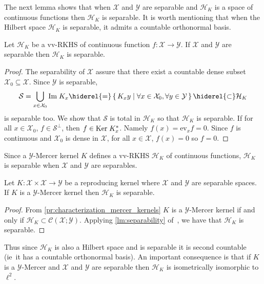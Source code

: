 The next lemma shows that when $\mathcal{X}$ and $\mathcal{Y}$ are separable
and $\mathcal{H}_K$ is a space of continuous functions then $\mathcal{H}_K$ is
separable. It is worth mentioning that when the Hilbert space $\mathcal{H}_K$
is separable, it admits a countable orthonormal basis.
\begin{lemma}
    \label{lm:separability} Let $\mathcal{H}_K$ be a \acl{vv-RKHS} of
    continuous function $f:\mathcal{X}\to\mathcal{Y}$. If $\mathcal{X}$ and
    $\mathcal{Y}$ are separable then $\mathcal{H}_K$ is separable.
\end{lemma}
\begin{proof}
    The separability of $\mathcal{X}$ assure that there exist a countable dense
    subset $\mathcal{X}_0\subseteq\mathcal{X}$. Since $\mathcal{Y}$ is
    separable,
    \begin{dmath*}
        \mathcal{S}=\bigcup_{x\in\mathcal{X}_0}\Ima K_x
        \hiderel{=}\set{K_xy|\forall x\in\mathcal{X}_0, \forall
        y\in\mathcal{Y}}\hiderel{\subset} \mathcal{H}_K
    \end{dmath*}
    is separable too. We show that $\mathcal{S}$ is total in $\mathcal{H}_K$ so
    that $\mathcal{H}_K$ is separable. If for all $x\in\mathcal{X}_0$,
    $f\in\mathcal{S}^{\perp}$, then $f\in\text{Ker}\; K_x^*$. Namely
    $f(x)=\text{ev}_xf=0$. Since $f$ is continuous and $\mathcal{X}_0$ is dense
    in $\mathcal{X}$, for all $x\in\mathcal{X}$, $f(x)=0$ so $f=0$.
\end{proof}
Since a $\mathcal{Y}$-Mercer kernel $K$ defines a \ac{vv-RKHS} $\mathcal{H}_K$
of continuous functions, $\mathcal{H}_K$ is separable when $\mathcal{X}$ and
$\mathcal{Y}$ are separables.
\begin{proposition}
    \label{pr:mercer_countable_basis} Let
    $K:\mathcal{X}\times\mathcal{X}\to\mathcal{Y}$ be a reproducing kernel
    where $\mathcal{X}$ and $\mathcal{Y}$ are separable spaces. If $K$ is a
    $\mathcal{Y}$-Mercer kernel then $\mathcal{H}_K$ is separable.
\end{proposition}
\begin{proof}
    From \cref{pr:characterization_mercer_kernels} $K$ is a
    $\mathcal{Y}$-Mercer kernel if and only if $\mathcal{H}_K\subset
    \mathcal{C}(\mathcal{X};\mathcal{Y})$. Applying \cref{lm:separability}
    of~\citet{carmeli2006vector}, we have that $\mathcal{H}_K$ is separable.
\end{proof}
Thus since $\mathcal{H}_K$ is also a Hilbert space and is separable it is
second countable (\acs{ie}~it has a countable orthonormal basis). An important
consequence is that if $K$ is a $\mathcal{Y}$-Mercer and $\mathcal{X}$ and
$\mathcal{Y}$ are separable then $\mathcal{H}_K$ is isometrically isomorphic to
$\ell^2$.

